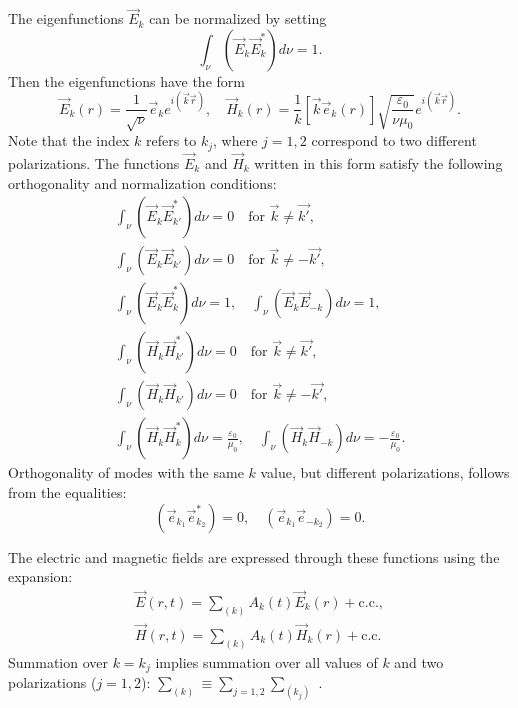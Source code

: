 The eigenfunctions $\vec{E}_k$ can be normalized by setting
\begin{equation}
\int_{\nu} \left( \vec{E}_k \vec{E}_{k}^{*} \right) d \nu = 1.
\end{equation}
Then the eigenfunctions have the form
\[
\vec{E}_k\left(r\right) = \frac{1}{\sqrt{\nu}}\vec{e}_k e^{i \left( \vec{k}\vec{r}\right)},
\quad
\vec{H}_k\left(r\right) = 
\frac{1}{k}
\left[\vec{k}\vec{e}_k\left(r\right)\right] 
\sqrt{\frac{\varepsilon_0}{\nu \mu_0}}
e^{i \left( \vec{k}\vec{r}\right)}.
\]
Note that the index $k$ refers to $k_j$, where $j = 1, 2$ correspond to two different polarizations.  
The functions $\vec{E}_k$ and $\vec{H}_k$ written in this form satisfy the following orthogonality and normalization conditions: 
\begin{eqnarray}
\int_{\nu} \left( \vec{E}_k \vec{E}_{k'}^{*} \right) d \nu = 0
\quad
\mbox{for } \vec{k} \ne \vec{k'},
\nonumber \\
\int_{\nu} \left( \vec{E}_k \vec{E}_{k'} \right) d \nu = 0
\quad
\mbox{for } \vec{k} \ne - \vec{k'},
\nonumber \\
\int_{\nu} \left( \vec{E}_k \vec{E}_{k}^{*} \right) d \nu = 1,
\quad
\int_{\nu} \left( \vec{E}_k \vec{E}_{-k} \right) d \nu = 1,
\nonumber \\
\int_{\nu} \left( \vec{H}_k \vec{H}_{k'}^{*} \right) d \nu = 0
\quad
\mbox{for } \vec{k} \ne \vec{k'},
\nonumber \\
\int_{\nu} \left( \vec{H}_k \vec{H}_{k'} \right) d \nu = 0
\quad
\mbox{for } \vec{k} \ne - \vec{k'},
\nonumber \\
\int_{\nu} \left( \vec{H}_k \vec{H}_{k}^{*} \right) d \nu = \frac{\varepsilon_0}{\mu_0},
\quad
\int_{\nu} \left( \vec{H}_k \vec{H}_{-k} \right) d \nu = - \frac{\varepsilon_0}{\mu_0}.
\label{eqCh1_task2}
\end{eqnarray}
Orthogonality of modes with the same $k$ value, but different polarizations, follows from the equalities:  
\[
\left(\vec{e}_{k_1} \vec{e}_{k_2}^{*}\right) = 0, \quad
\left(\vec{e}_{k_1} \vec{e}_{- k_2}\right) = 0.
\]

The electric and magnetic fields are expressed through these functions using the expansion:
\begin{eqnarray}
\vec{E}\left(r, t\right) = 
\sum_{(k)} 
A_k\left(t\right) \vec{E}_k\left(r\right) +
\text{c.c.},
\nonumber \\
\vec{H}\left(r, t\right) = 
\sum_{(k)} 
A_k\left(t\right) \vec{H}_k\left(r\right) +
\text{c.c.}
\label{eqCh1_separation4six}
\end{eqnarray}
Summation over $k = k_j$ implies summation over all values of
$k$ and two polarizations ($j = 1,2$): 
$\sum_{(k)} \equiv \sum_{j = 1,2} \sum_{(k_j)}$ .
  
